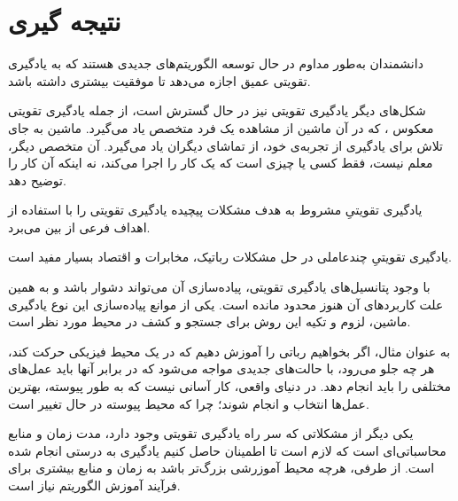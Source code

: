\documentclass[12pt]{report}
\begin{document}
\newpage

\section{نتیجه گیری}
دانشمندان به‌طور مداوم در حال توسعه الگوریتم‌های جدیدی هستند که به یادگیری تقویتی عمیق اجازه می‌دهد تا موفقیت بیشتری داشته باشد.

شکل‌های دیگر یادگیری تقویتی نیز در حال گسترش است، از جمله یادگیری تقویتی معکوس  ، که در آن ماشین از مشاهده یک فرد متخصص یاد می‌گیرد. ماشین به جای تلاش برای یادگیری از تجربه‌ی خود، از تماشای دیگران یاد می‌گیرد. آن متخصص دیگر، معلم نیست، فقط کسی یا چیزی است که یک کار را اجرا می‌کند، نه اینکه آن کار را توضیح دهد.

یادگیری تقویتیِ مشروط به هدف   مشکلات پیچیده یادگیری تقویتی را با استفاده از اهداف فرعی از بین می‌برد.

یادگیری تقویتیِ چندعاملی   در حل مشکلات رباتیک، مخابرات و اقتصاد بسیار مفید است.

با وجود پتانسیل‌های یادگیری تقویتی، پیاده‌سازی آن می‌تواند دشوار باشد و به همین علت کاربردهای آن هنوز محدود مانده است. یکی از موانع پیاده‌سازی این نوع یادگیری ماشین، لزوم و تکیه این روش برای جستجو و کشف در محیط مورد نظر است.

به عنوان مثال، اگر بخواهیم رباتی را آموزش دهیم که در یک محیط فیزیکی حرکت کند، هر چه جلو می‌رود، با حالت‌های جدیدی مواجه می‌شود که در برابر آنها باید عمل‌های مختلفی را باید انجام دهد. در دنیای واقعی، کار آسانی نیست که به طور پیوسته، بهترین عمل‌ها انتخاب و انجام شوند؛ چرا که محیط پیوسته در حال تغییر است.

یکی دیگر از مشکلاتی که سر راه یادگیری تقویتی وجود دارد، مدت زمان و منابع محاسباتی‌ای است که لازم است تا اطمینان حاصل کنیم یادگیری به درستی انجام شده است. از طرفی، هرچه محیط آموزرشی بزرگ‌تر باشد به زمان و منابع بیشتری برای فرآیند آموزش الگوریتم نیاز است.
\end{document}
